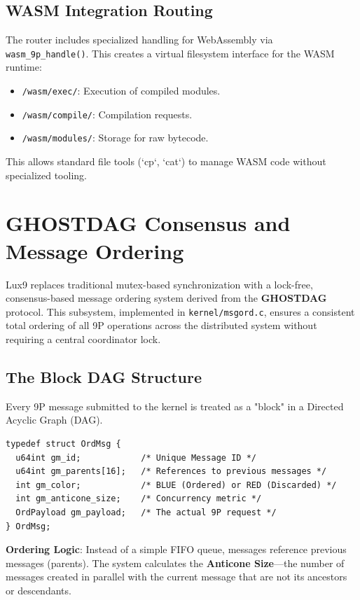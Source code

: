\documentclass[11pt,letterpaper]{article}
\begin{document}
\subsection{WASM Integration Routing}

The router includes specialized handling for WebAssembly via \texttt{wasm_9p_handle()}. This creates a virtual filesystem interface for the WASM runtime:

\begin{itemize}
\item \texttt{/wasm/exec/}: Execution of compiled modules.
\item \texttt{/wasm/compile/}: Compilation requests.
\item \texttt{/wasm/modules/}: Storage for raw bytecode.
\end{itemize}

This allows standard file tools (`cp`, `cat`) to manage WASM code without specialized tooling.

\section{GHOSTDAG Consensus and Message Ordering}

Lux9 replaces traditional mutex-based synchronization with a lock-free, consensus-based message ordering system derived from the \textbf{GHOSTDAG} protocol. This subsystem, implemented in \texttt{kernel/msgord.c}, ensures a consistent total ordering of all 9P operations across the distributed system without requiring a central coordinator lock.

\subsection{The Block DAG Structure}

Every 9P message submitted to the kernel is treated as a "block" in a Directed Acyclic Graph (DAG).

\begin{lstlisting}
typedef struct OrdMsg {
  u64int gm_id;            /* Unique Message ID */
  u64int gm_parents[16];   /* References to previous messages */
  int gm_color;            /* BLUE (Ordered) or RED (Discarded) */
  int gm_anticone_size;    /* Concurrency metric */
  OrdPayload gm_payload;   /* The actual 9P request */
} OrdMsg;
\end{lstlisting}

\textbf{Ordering Logic}:
Instead of a simple FIFO queue, messages reference previous messages (parents). The system calculates the \textbf{Anticone Size}—the number of messages created in parallel with the current message that are not its ancestors or descendants.
\end{document}
